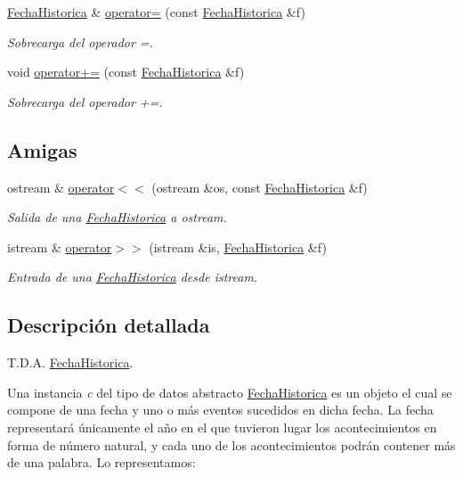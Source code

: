 \begin{DoxyCompactItemize}
\hyperlink{classFechaHistorica}{Fecha\+Historica} \& \hyperlink{classFechaHistorica_a4e6922a922949ad3395c20df452fbff7}{operator=} (const \hyperlink{classFechaHistorica}{Fecha\+Historica} \&f)
\begin{DoxyCompactList}\small\item\em Sobrecarga del operador =. \end{DoxyCompactList}\item 
void \hyperlink{classFechaHistorica_aaa7a9f75f3620b0a09e55c6675ebec4a}{operator+=} (const \hyperlink{classFechaHistorica}{Fecha\+Historica} \&f)
\begin{DoxyCompactList}\small\item\em Sobrecarga del operador +=. \end{DoxyCompactList}\end{DoxyCompactItemize}
\subsection*{Amigas}
\begin{DoxyCompactItemize}
\item 
ostream \& \hyperlink{classFechaHistorica_ae7ffc75da1b9b42da839968d57c0dc9c}{operator$<$$<$} (ostream \&os, const \hyperlink{classFechaHistorica}{Fecha\+Historica} \&f)
\begin{DoxyCompactList}\small\item\em Salida de una \hyperlink{classFechaHistorica}{Fecha\+Historica} a ostream. \end{DoxyCompactList}\item 
istream \& \hyperlink{classFechaHistorica_a25a93d162aadd3c52aa1f3d1831e3d75}{operator$>$$>$} (istream \&is, \hyperlink{classFechaHistorica}{Fecha\+Historica} \&f)
\begin{DoxyCompactList}\small\item\em Entrada de una \hyperlink{classFechaHistorica}{Fecha\+Historica} desde istream. \end{DoxyCompactList}\end{DoxyCompactItemize}


\subsection{Descripción detallada}
T.\+D.\+A. \hyperlink{classFechaHistorica}{Fecha\+Historica}. 

Una instancia {\itshape c} del tipo de datos abstracto {\ttfamily \hyperlink{classFechaHistorica}{Fecha\+Historica}} es un objeto el cual se compone de una fecha y uno o más eventos sucedidos en dicha fecha. La fecha representará únicamente el año en el que tuvieron lugar los acontecimientos en forma de número natural, y cada uno de los acontecimientos podrán contener más de una palabra. Lo representamos\+:

